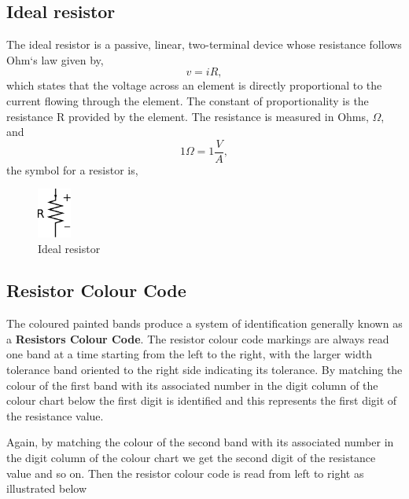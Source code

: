 \documentclass[a4 paper]{article}
\numberwithin{equation}{section}
\newcommand{\0}{\mathbf{0}}
\begin{document}

\subsection{Ideal resistor}
The ideal resistor is a passive, linear, two-terminal device whose resistance follows Ohm`s law given by,
\begin{equation}
v = iR,
\end{equation}
which states that the voltage across an element is directly proportional to the current flowing through the element. The constant of proportionality is the resistance R provided by the element. The resistance is measured in Ohms, $\Omega$, and
\begin{equation}
1 \Omega = 1 \frac{V}{A},
\end{equation}
the symbol for a resistor is,

\begin{figure}[!ht]
  \caption{Ideal resistor}
  \centering
  \includegraphics[width=0.1\textwidth]{./images/circuit1/resistor}
\end{figure}



\subsection{Resistor Colour Code}
The coloured painted bands produce a system of identification generally known as a {\bf Resistors Colour Code}.
The resistor colour code markings are always read one band at a time starting from the left to the right, with the larger width tolerance band oriented to the right side indicating its tolerance. By matching the colour of the first band with its associated number in the digit column of the colour chart below the first digit is identified and this represents the first digit of the resistance value.

Again, by matching the colour of the second band with its associated number in the digit column of the colour chart we get the second digit of the resistance value and so on. Then the resistor colour code is read from left to right as illustrated below
\end{document}
